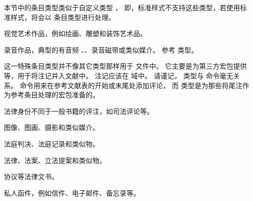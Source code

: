 本节中的条目类型类似于自定义类型 ，
即，标准样式不支持这些类型，若使用标准样式，将会以  条目类型进行处理。

\begin{typelist}

视觉艺术作品，例如绘画、雕塑和装饰艺术品。

录音作品，典型的有音频 、、录音磁带或类似媒介。
参考  类型。

这一特殊条目类型并不像其它类型那样用于  文件中。
它主要是为第三方宏包提供  等，用于将注记并入文献中。
注记应该在  域中。
请谨记， 类型与  命令毫无关系。
 命令用来在参考文献表的开始或末尾处添加评论，
而  类型是为那些将尾注作为参考条目处理的宏包准备的。

法律身份不同于一般书籍的评注，如司法评论等。

图像、图画、摄影和类似媒介。

法庭判决、法庭记录和类似物。

法律、法案、立法提案和类似物。

协议等法律文书。

私人函件，例如信件、电子邮件、备忘录等。


\end{typelist}
